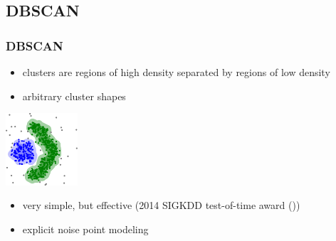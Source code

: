 \documentclass[Nike]{tuberlinbeamer}
\begin{document}
\subsection{DBSCAN}
\begin{frame}
  \frametitle{DBSCAN}
  \begin{itemize}
    \item clusters are regions of high density separated by regions of low density
    \item arbitrary cluster shapes
  \end{itemize}
  \begin{centering}
  \includegraphics[width=0.2\textwidth]{DBSCAN_data.png}
  \end{centering}
  \pause
  \normalsize
  \begin{itemize}
    \item very simple, but effective (2014 SIGKDD test-of-time award (\cite{schubert2017dbscan}))\\
    \item explicit noise point modeling
  \end{itemize}
\end{frame}
\end{document}
